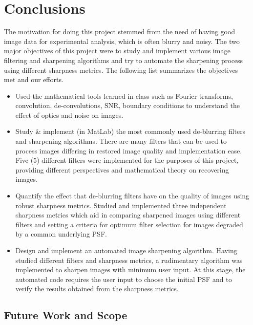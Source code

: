 
\section{Conclusions}
The motivation for doing this project stemmed from the need of having good image data for experimental analysis, which is often blurry and noisy. The two major objectives of this project were to study and implement various image filtering and sharpening algorithms and try to automate the sharpening process using different sharpness metrics. The following list summarizes the objectives met and our efforts.

\begin{itemize}
\item Used the mathematical tools learned in class such as Fourier transforms, convolution, de-convolutions, SNR, boundary conditions to understand the effect of optics and noise on images.

\item Study \& implement (in MatLab) the most commonly used de-blurring filters and sharpening algorithms. There are many filters that can be used to process images differing in restored image quality and implementation ease. Five (5) different filters were implemented for the purposes of this project, providing different perspectives and mathematical theory on recovering images.

\item Quantify the effect that de-blurring filters have on the quality of images using robust sharpness metrics. Studied and implemented three independent sharpness metrics which aid in comparing sharpened images using different filters and setting a criteria for optimum filter selection for images degraded by a common underlying PSF.

\item Design and implement an automated image sharpening algorithm. Having studied different filters and sharpness metrics, a rudimentary algorithm was implemented to sharpen images with minimum user input. At this stage, the automated code requires the user input to choose the initial PSF and to verify the results obtained from the sharpness metrics. 
\end{itemize}

\subsection{ Future Work and Scope }

